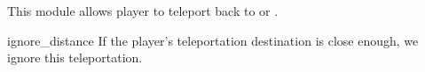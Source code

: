 This module allows player to teleport back to  or .


\begin{Configuration}
    \item[ignore\_distance]{
        If the player's teleportation destination is close enough, we ignore this teleportation.
    }
\end{Configuration}



